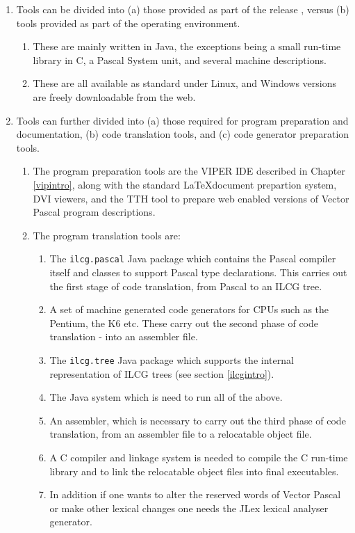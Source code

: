 \begin{enumerate}
\item Tools can be divided into (a) those provided as part of the release
, versus (b) tools provided as part of the operating environment. 

\begin{enumerate}
\item These are mainly written in Java, the exceptions being a small run-time
library in C, a Pascal System unit, and several machine descriptions. 
\item These are all available as standard under Linux, and Windows versions
are freely downloadable from the web. 
\end{enumerate}
\item Tools can further divided into (a) those required for program preparation
and documentation, (b) code translation tools, and (c) code generator
preparation tools. 

\begin{enumerate}
\item The program preparation tools are the VIPER IDE described in Chapter
\ref{vipintro}, along with the standard \LaTeX{}document prepartion
system, DVI viewers, and the TTH tool to prepare web enabled versions
of Vector Pascal program descriptions. 
\item The program translation tools are: 

\begin{enumerate}
\item The \texttt{ilcg.pascal} Java package which contains the Pascal compiler
itself and classes to support Pascal type declarations. This carries
out the first stage of code translation, from Pascal to an ILCG tree\cite{Cockshott00}. 
\item A set of machine generated code generators for CPUs such as the Pentium,
the K6 etc. These carry out the second phase of code translation -
into an assembler file. 
\item The \texttt{ilcg.tree} Java package which supports the internal representation
of ILCG trees (see section \ref{ilcgintro}). 
\item The Java system which is need to run all of the above. 
\item An assembler, which is necessary to carry out the third phase of code
translation, from an assembler file to a relocatable object file. 
\item A C compiler and linkage system is needed to compile the C run-time
library and to link the relocatable object files into final executables. 
\item In addition if one wants to alter the reserved words of Vector Pascal
or make other lexical changes one needs the JLex lexical analyser
generator.
\end{enumerate}
\end{enumerate}
\end{enumerate}

